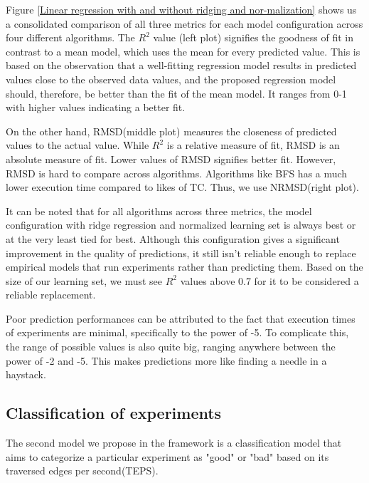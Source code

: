 Figure \ref{Linear regression with and without ridging and nor-malization} shows us a consolidated comparison of all three metrics for each model configuration across four different algorithms. The $R^2$ value (left plot) signifies the goodness of fit in contrast to a mean model, which uses the mean for every predicted value. This is based on the observation that a well-fitting regression model results in predicted values close to the observed data values, and the proposed regression model should, therefore, be better than the fit of the mean model. It ranges from 0-1 with higher values indicating a better fit. 

On the other hand, RMSD(middle plot) measures the closeness of predicted values to the actual value. While $R^2$ is a relative measure of fit, RMSD is an absolute measure of fit. Lower values of RMSD signifies better fit. However, RMSD is hard to compare across algorithms. Algorithms like BFS has a much lower execution time compared to likes of TC. Thus, we use NRMSD(right plot).

It can be noted that for all algorithms across three metrics, the model configuration with ridge regression and normalized learning set is always best or at the very least tied for best. Although this configuration gives a significant improvement in the quality of predictions, it still isn't reliable enough to replace empirical models that run experiments rather than predicting them. Based on the size of our learning set, we must see  $R^2$ values above 0.7 for it to be considered a reliable replacement. 

Poor prediction performances can be attributed to the fact that execution times of experiments are minimal, specifically to the power of -5. To complicate this, the range of possible values is also quite big, ranging anywhere between the power of -2 and -5. This makes predictions more like finding a needle in a haystack.

\subsection{Classification of experiments}
The second model we propose in the framework is a classification model that aims to categorize a particular experiment as "good" or "bad" based on its traversed edges per second(TEPS).   

